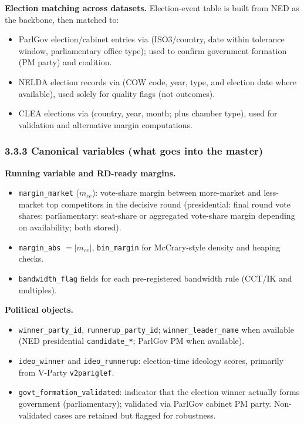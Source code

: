 \documentclass[11pt]{article}
\newcommand{\1}{\mathbf{1}}
\newcommand{\cid}{c}
\newcommand{\eid}{e}
\begin{document}
\textbf{Election matching across datasets.}
Election-event table is built from NED as the backbone, then matched to:
\begin{itemize}[leftmargin=1.2em]
\item ParlGov election/cabinet entries via (ISO3/country, date within tolerance window, parliamentary office type); used to confirm government formation (PM party) and coalition.
\item NELDA election records via (COW code, year, type, and election date where available), used solely for quality flags (not outcomes).
\item CLEA elections via (country, year, month; plus chamber type), used for validation and alternative margin computations.
\end{itemize}

\subsubsection*{3.3.3 Canonical variables (what goes into the master)}
\textbf{Running variable and RD-ready margins.}
\begin{itemize}[leftmargin=1.2em]
\item \texttt{margin\_market} ($m_{\cid \eid}$): vote-share margin between more-market and less-market top competitors in the decisive round (presidential: final round vote shares; parliamentary: seat-share or aggregated vote-share margin depending on availability; both stored).
\item \texttt{margin\_abs} $=|m_{\cid \eid}|$, \texttt{bin\_margin} for McCrary-style density and heaping checks.
\item \texttt{bandwidth\_flag} fields for each pre-registered bandwidth rule (CCT/IK and multiples).
\end{itemize}

\textbf{Political objects.}
\begin{itemize}[leftmargin=1.2em]
\item \texttt{winner\_party\_id}, \texttt{runnerup\_party\_id}; \texttt{winner\_leader\_name} when available (NED presidential \texttt{candidate\_*}; ParlGov PM when available).
\item \texttt{ideo\_winner} and \texttt{ideo\_runnerup}: election-time ideology scores, primarily from V-Party \texttt{v2pariglef}.
\item \texttt{govt\_formation\_validated}: indicator that the election winner actually forms government (parliamentary); validated via ParlGov cabinet PM party. Non-validated cases are retained but flagged for robustness.
\end{itemize}
\end{document}
